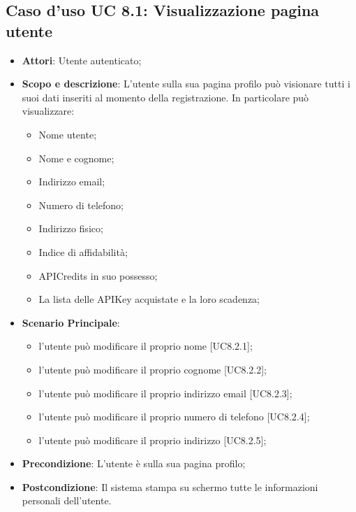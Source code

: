 \documentclass[12pt,a4paper,titlepage]{article}
\begin{document}
	\subsection{Caso d'uso UC 8.1: Visualizzazione pagina utente}
	\label{UC8.1}
	\begin{itemize}
		\item \textbf{Attori}: Utente autenticato;
		\item \textbf{Scopo e descrizione}: L'utente sulla sua pagina profilo può visionare tutti i suoi dati inseriti al momento della registrazione. In particolare può visualizzare:
		\begin{itemize}
			\item Nome utente;
			\item Nome e cognome;
			\item Indirizzo email;
			\item Numero di telefono;
			\item Indirizzo fisico;
			\item Indice di affidabilità;
			\item APICredits in suo possesso;
			\item La lista delle APIKey acquistate e la loro scadenza;
		\end{itemize}
		\item \textbf{Scenario Principale}:
		\begin{itemize}
			\item l'utente può modificare il proprio nome [UC8.2.1];
			\item l'utente può modificare il proprio cognome [UC8.2.2];
			\item l'utente può modificare il proprio indirizzo email [UC8.2.3];
			\item l'utente può modificare il proprio numero di telefono [UC8.2.4];
			\item l'utente può modificare il proprio indirizzo [UC8.2.5];
		\end{itemize}
		\item \textbf{Precondizione}: L'utente è sulla sua pagina profilo;
		\item \textbf{Postcondizione}: Il sistema stampa su schermo tutte le informazioni personali dell'utente.
	\end{itemize}
\end{document}
